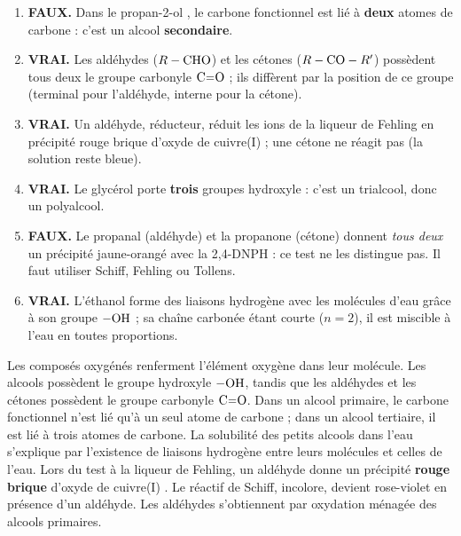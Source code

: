 \documentclass[11pt]{article}
\newcommand{\cle}[1]{{\popxbold\color{popdark}#1}}
\begin{document}
\begin{corrige}
\begin{enumerate}
\item \textbf{FAUX.} Dans le propan-2-ol , le carbone fonctionnel est lié à \textbf{deux} atomes de carbone : c'est un alcool \textbf{secondaire}.
\item \textbf{VRAI.} Les aldéhydes ($R-\ce{CHO}$) et les cétones ($R-\ce{CO}-R'$) possèdent tous deux le groupe \cle{carbonyle} $\ce{C=O}$ ; ils diffèrent par la position de ce groupe (terminal pour l'aldéhyde, interne pour la cétone).
\item \textbf{VRAI.} Un aldéhyde, \cle{réducteur}, réduit les ions  de la liqueur de Fehling en précipité rouge brique d'oxyde de cuivre(I)  ; une cétone ne réagit pas (la solution reste bleue).
\item \textbf{VRAI.} Le glycérol  porte \textbf{trois} groupes hydroxyle : c'est un \cle{trialcool}, donc un \cle{polyalcool}.
\item \textbf{FAUX.} Le propanal (aldéhyde) et la propanone (cétone) donnent \emph{tous deux} un précipité jaune-orangé avec la 2,4-DNPH : ce test ne les distingue pas. Il faut utiliser Schiff, Fehling ou Tollens.
\item \textbf{VRAI.} L'éthanol forme des \cle{liaisons hydrogène} avec les molécules d'eau grâce à son groupe $-\ce{OH}$ ; sa chaîne carbonée étant courte ($n=2$), il est \cle{miscible} à l'eau en toutes proportions.
\end{enumerate}
\end{corrige}

\begin{corrige}
Les \cle{composés oxygénés} renferment l'élément oxygène dans leur molécule. Les alcools possèdent le groupe \cle{hydroxyle} $-\ce{OH}$, tandis que les aldéhydes et les cétones possèdent le groupe \cle{carbonyle} $\ce{C=O}$. Dans un alcool \cle{primaire}, le carbone fonctionnel n'est lié qu'à un seul atome de carbone ; dans un alcool \cle{tertiaire}, il est lié à trois atomes de carbone. La \cle{solubilité} des petits alcools dans l'eau s'explique par l'existence de liaisons \cle{hydrogène} entre leurs molécules et celles de l'eau. Lors du test à la liqueur de Fehling, un aldéhyde donne un précipité \textbf{rouge brique} d'oxyde de cuivre(I) . Le réactif de \cle{Schiff}, incolore, devient rose-violet en présence d'un aldéhyde. Les aldéhydes s'obtiennent par \cle{oxydation ménagée} des alcools primaires.
\end{corrige}
\end{document}
